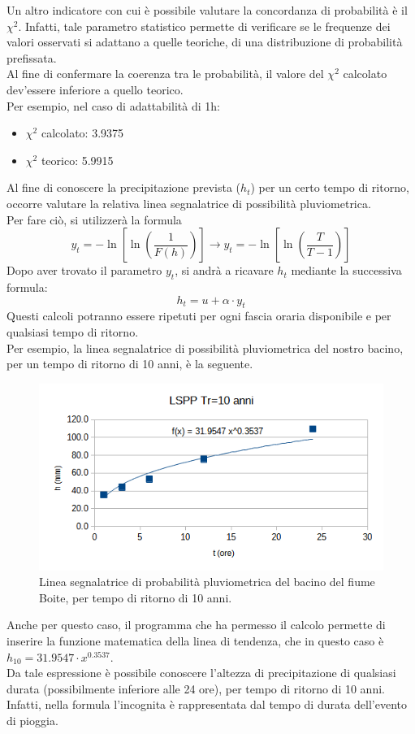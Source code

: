 Un altro indicatore con cui è possibile valutare la concordanza di probabilità è il $\chi ^2$. Infatti, tale parametro statistico permette di verificare se le frequenze dei valori osservati si adattano a quelle teoriche, di una distribuzione di probabilità prefissata.\\
Al fine di confermare la coerenza tra le probabilità, il valore del $\chi ^2$ calcolato dev'essere inferiore a quello teorico.\\
Per esempio, nel caso di adattabilità di 1h: 
\begin{itemize}
    \item $\chi ^2$ calcolato: 3.9375
    \item $\chi ^2$ teorico: 5.9915
\end{itemize}
Al fine di conoscere la precipitazione prevista ($h_t$) per un certo tempo di ritorno, occorre valutare la relativa linea segnalatrice di possibilità pluviometrica.\\
Per fare ciò, si utilizzerà la formula 
\begin{equation}
    y_{t}= -\ln \left[ \ln \left(\frac{1}{F(h)} \right) \right] \rightarrow y_{t}= -\ln \left[ \ln \left(\frac{T}{T-1} \right) \right]
    \label{variabile_ridotta}
\end{equation}
Dopo aver trovato il parametro $y_t$, si andrà a ricavare $h_t$ mediante la successiva formula:
\begin{equation}
h_t = u + \alpha \cdot y_t    
\label{h_t}
\end{equation}
Questi calcoli potranno essere ripetuti per ogni fascia oraria disponibile e per qualsiasi tempo di ritorno.\\
Per esempio, la linea segnalatrice di possibilità pluviometrica del nostro bacino, per un tempo di ritorno di 10 anni, è la seguente.
\begin{figure}[H]
    \centering
    \includegraphics[width=0.7 \textwidth]{immagini/lspp_10anni.png}
    \caption{Linea segnalatrice di probabilità pluviometrica del bacino del fiume Boite, per tempo di ritorno di 10 anni.}
    \label{fig:lspp_10anni}
\end{figure}
Anche per questo caso, il programma che ha permesso il calcolo permette di inserire la funzione matematica della linea di tendenza, che in questo caso è $h_{10}= 31.9547 \cdot x^{0.3537}$. \\
Da tale espressione è possibile conoscere l'altezza di precipitazione di qualsiasi durata (possibilmente inferiore alle 24 ore), per tempo di ritorno di 10 anni. Infatti, nella formula l'incognita è rappresentata dal tempo di durata dell'evento di pioggia.

